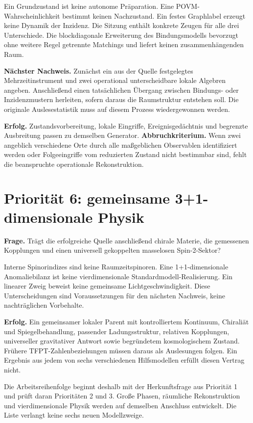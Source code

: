 Ein Grundzustand ist keine autonome Präparation. Eine POVM-Wahrscheinlichkeit bestimmt keinen Nachzustand. Ein festes Graphlabel erzeugt keine Dynamik der Inzidenz. Die Sitzung enthält konkrete Zeugen für alle drei Unterschiede. Die blockdiagonale Erweiterung des Bindungsmodells bevorzugt ohne weitere Regel getrennte Matchings und liefert keinen zusammenhängenden Raum.

\textbf{Nächster Nachweis.} Zunächst ein aus der Quelle festgelegtes Mehrzeitinstrument und zwei operational unterscheidbare lokale Algebren angeben. Anschließend einen tatsächlichen Übergang zwischen Bindungs- oder Inzidenzmustern herleiten, sofern daraus die Raumstruktur entstehen soll. Die originale Auslesestatistik muss auf diesem Prozess wiedergewonnen werden.

\textbf{Erfolg.} Zustandsvorbereitung, lokale Eingriffe, Ereignisgedächtnis und begrenzte Ausbreitung passen zu demselben Generator. \textbf{Abbruchkriterium.} Wenn zwei angeblich verschiedene Orte durch alle maßgeblichen Observablen identifiziert werden oder Folgeeingriffe vom reduzierten Zustand nicht bestimmbar sind, fehlt die beanspruchte operationale Rekonstruktion.

\section{Priorität 6: gemeinsame 3+1-dimensionale Physik}
\textbf{Frage.} Trägt die erfolgreiche Quelle anschließend chirale Materie, die gemessenen Kopplungen und einen universell gekoppelten masselosen Spin-2-Sektor?

Interne Spinorindizes sind keine Raumzeitspinoren. Eine 1+1-dimensionale Anomaliebilanz ist keine vierdimensionale Standardmodell-Realisierung. Ein linearer Zweig beweist keine gemeinsame Lichtgeschwindigkeit. Diese Unterscheidungen sind Voraussetzungen für den nächsten Nachweis, keine nachträglichen Vorbehalte.

\textbf{Erfolg.} Ein gemeinsamer lokaler Parent mit kontrolliertem Kontinuum, Chiraliät und Spiegelbehandlung, passender Ladungsstruktur, relativen Kopplungen, universeller gravitativer Antwort sowie begründetem kosmologischem Zustand. Frühere TFPT-Zahlenbeziehungen müssen daraus als Auslesungen folgen. Ein Ergebnis aus jedem von sechs verschiedenen Hilfsmodellen erfüllt diesen Vertrag nicht.

Die Arbeitsreihenfolge beginnt deshalb mit der Herkunftsfrage aus Priorität 1 und prüft daran Prioritäten 2 und 3. Große Phasen, räumliche Rekonstruktion und vierdimensionale Physik werden auf demselben Anschluss entwickelt. Die Liste verlangt keine sechs neuen Modellzweige.

